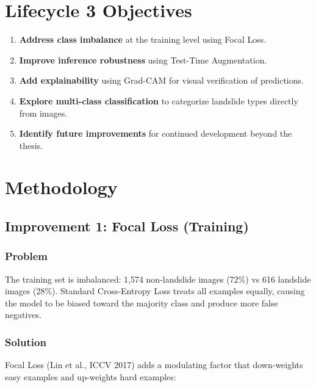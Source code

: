 \documentclass[11pt]{article}
\begin{document}
\section{Lifecycle 3 Objectives}

\begin{enumerate}
    \item \textbf{Address class imbalance} at the training level using Focal Loss.
    \item \textbf{Improve inference robustness} using Test-Time Augmentation.
    \item \textbf{Add explainability} using Grad-CAM for visual verification of predictions.
    \item \textbf{Explore multi-class classification} to categorize landslide types directly from images.
    \item \textbf{Identify future improvements} for continued development beyond the thesis.
\end{enumerate}

\section{Methodology}

\subsection{Improvement 1: Focal Loss (Training)}

\subsubsection{Problem}

The training set is imbalanced: 1,574 non-landslide images (72\%) vs 616 landslide images (28\%). Standard Cross-Entropy Loss treats all examples equally, causing the model to be biased toward the majority class and produce more false negatives.

\subsubsection{Solution}

Focal Loss (Lin et al., ICCV 2017) adds a modulating factor that down-weights easy examples and up-weights hard examples:
\end{document}
